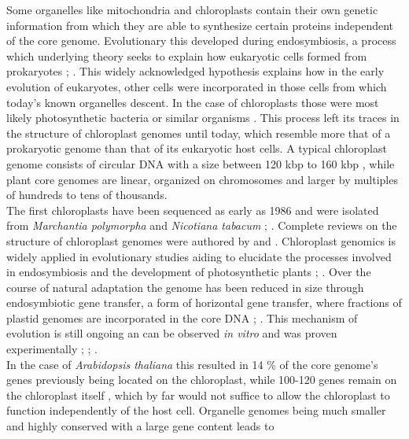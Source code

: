 Some organelles like mitochondria and chloroplasts contain their own genetic information from which they are
able to synthesize certain proteins independent of the core genome. Evolutionary this developed during
endosymbiosis, a process which underlying theory seeks to explain how eukaryotic cells formed from prokaryotes
\cite{mereschkowsky1905uber}; \cite{kutschera2005endosymbiosis}. This widely acknowledged hypothesis explains
how in the early evolution of eukaryotes, other cells were incorporated in those cells from which today's
known organelles descent. In the case of chloroplasts those were most likely photosynthetic bacteria or
similar organisms \cite{archibald2015endosymbiosis}. This process left its traces in the structure of
chloroplast genomes until today, which resemble more that of a prokaryotic genome than that of its eukaryotic
host cells. A typical chloroplast genome consists of circular DNA with a size between 120 kbp to 160 kbp
\cite{palmer_1985}, while plant core genomes are linear, organized on chromosomes and larger by multiples of
hundreds to tens of thousands. \\
The first chloroplasts have been sequenced as early as 1986 and were isolated from \textit{Marchantia
  polymorpha} and \textit{Nicotiana tabacum} \cite{ohyama_chloroplast_1986};
\cite{shinozaki_complete_1986}. Complete reviews on the structure of chloroplast genomes were authored by
\cite{green_chloroplast_2011} and \cite{wicke_evolution_2011}. Chloroplast genomics is widely applied in
evolutionary studies aiding to elucidate the processes involved in endosymbiosis and the development of
photosynthetic plants \cite{martin_evolutionary_2002}; \cite{xiao-ming_inferring_2017}. Over the course of
natural adaptation the genome has been reduced in size through endosymbiotic gene transfer, a form of
horizontal gene transfer, where fractions of plastid genomes are incorporated in the core DNA
\cite{martin_evolutionary_2002}; \cite{deiner_environmental_2017}. This mechanism of evolution is still
ongoing an can be observed \textit{in vitro} and was proven experimentally \cite{bock2017witnessing};
\cite{fuentes2014horizontal}; \cite{stegemann2009exchange}. \\
In the case of \textit{Arabidopsis thaliana} this resulted in 14 \% of the core genome's genes previously
being located on the chloroplast, while 100-120 genes remain on the chloroplast itself
\cite{wicke_evolution_2011}, which by far would not suffice to allow the chloroplast to function independently
of the host cell. Organelle genomes being much smaller and highly conserved with a large gene content leads to
